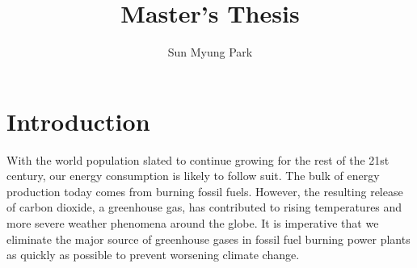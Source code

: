 \documentclass[letterpaper]{article}
\begin{document}
\title{Master's Thesis}
\author{Sun Myung Park}
\date{}

\maketitle

\section*{Introduction}

With the world population slated to continue growing for the rest of the 21st century, our energy consumption is likely to follow suit. The bulk of energy production today comes from burning fossil fuels. However, the resulting release of carbon dioxide, a greenhouse gas, has contributed to rising temperatures and more severe weather phenomena around the globe. It is imperative that we eliminate the major source of greenhouse gases in fossil fuel burning power plants as quickly as possible to prevent worsening climate change.
\end{document}
